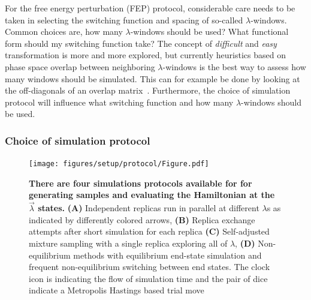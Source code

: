 \documentclass[9pt,bestpractices,pubversion]{livecoms}
\begin{document}
For the free energy perturbation (FEP) protocol, considerable care needs to be taken in selecting the switching function and spacing of so-called $\lambda$-windows. Common choices are, how many $\lambda$-windows should be used? What functional form should my switching function take? The concept of \textit{difficult} and \textit{easy} transformation is more and more explored, but currently heuristics based on phase space overlap between neighboring $\lambda$-windows is the best way to assess how many windows should be simulated. This can for example be done by looking at the off-diagonals of an overlap matrix~\cite{klimovich_guidelines_2015,kuhn_assessment_2020}. Furthermore, the choice of simulation protocol will influence what switching function and how many $\lambda$-windows should be used. 


\subsubsection{Choice of simulation protocol}

\begin{figure}
    \texttt{[image: figures/setup/protocol/Figure.pdf]}
    \caption{\textbf{There are four simulations protocols available for for generating samples and evaluating the Hamiltonian at the $\vec{\lambda}$ states.} \textbf{(A)} Independent replicas run in parallel at different $\lambda$s as indicated by differently colored arrows, \textbf{(B)} Replica exchange attempts after short simulation for each replica \textbf{(C)} Self-adjusted mixture sampling with a single replica exploring all of $\lambda$, \textbf{(D)} Non-equilibrium methods with equilibrium end-state simulation and frequent non-equilibrium switching between end states. The clock icon is indicating the flow of simulation time and the pair of dice indicate a Metropolis Hastings based trial move}
    \label{fig:protocols}
\end{figure}
\end{document}
